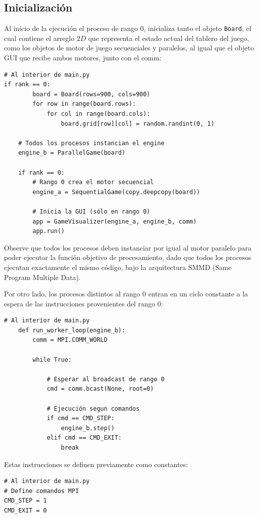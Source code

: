 \documentclass{article}
\begin{document}
\subsection{Inicialización}
Al inicio de la ejecución el proceso de rango 0, inicializa tanto el objeto \verb|Board|, el cual contiene el arreglo $2D$ que representa el estado actual del tablero del juego, como los objetos de motor de juego secuenciales y paralelos, al igual que el objeto GUI que recibe ambos motores, junto con el comm:
\begin{verbatim}
# Al interior de main.py
if rank == 0:
        board = Board(rows=900, cols=900)
        for row in range(board.rows):
            for col in range(board.cols):
                board.grid[row][col] = random.randint(0, 1)

    # Todos los procesos instancian el engine
    engine_b = ParallelGame(board)

    if rank == 0:
        # Rango 0 crea el motor secuencial
        engine_a = SequentialGame(copy.deepcopy(board))

        # Inicia la GUI (sólo en rango 0)
        app = GameVisualizer(engine_a, engine_b, comm)
        app.run()

\end{verbatim}

Observe que todos los procesos deben instanciar por igual al motor paralelo para poder ejecutar la función objetivo de procesamiento, dado que todos los procesos ejecutan exactamente el mismo código, bajo la arquitectura SMMD (Same Program Multiple Data).

Por otro lado, los procesos distintos al rango 0 entran en un ciclo constante a la espera de las instrucciones provenientes del rango 0:
\begin{verbatim}
# Al interior de main.py
    def run_worker_loop(engine_b):
        comm = MPI.COMM_WORLD
        
        while True:
            
            # Esperar al broadcast de rango 0
            cmd = comm.bcast(None, root=0)
    
            # Ejecución segun comandos
            if cmd == CMD_STEP:
                engine_b.step()
            elif cmd == CMD_EXIT:
                break
\end{verbatim}

Estas instrucciones se definen previamente como constantes:
\begin{verbatim}
# Al interior de main.py
# Define comandos MPI
CMD_STEP = 1
CMD_EXIT = 0
\end{verbatim}
\end{document}
